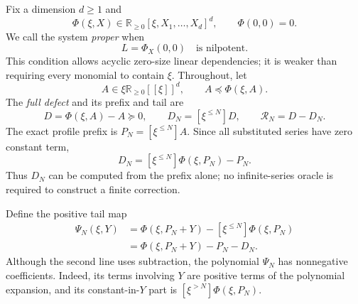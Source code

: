\documentclass[11pt,a4paper]{article}
\theoremstyle{definition}
\theoremstyle{remark}
\newcommand{\R}{\mathbb R}
\newcommand{\strunc}[1]{[\xi^{\le #1}]}
\newcommand{\shigh}[1]{[\xi^{>#1}]}
\newcommand{\satR}{\mathcal R}
\begin{document}
Fix a dimension $d\ge1$ and
\[
 \Phi(\xi,X)\in\R_{\ge0}[\xi,X_1,\ldots,X_d]^d,
 \qquad \Phi(0,0)=0.
\]
We call the system \emph{proper} when
\begin{equation}\label{kfp:sat:eq:proper}
 L=\Phi_X(0,0)\quad\text{is nilpotent}.
\end{equation}
This condition allows acyclic zero-size linear dependencies; it is weaker
than requiring every monomial to contain $\xi$. Throughout, let
\begin{equation}\label{kfp:sat:eq:subsolution}
 A\in \xi\R_{\ge0}[[\xi]]^d,
 \qquad A\preceq\Phi(\xi,A).
\end{equation}
The \emph{full defect} and its prefix and tail are
\begin{equation}\label{kfp:sat:eq:defects}
 D=\Phi(\xi,A)-A\succeq0,\qquad
 D_N=\strunc N D,\qquad
 \satR_N=D-D_N.
\end{equation}
The exact profile prefix is $P_N=\strunc N A$.
Since all substituted series have zero constant term,
\begin{equation}\label{kfp:sat:eq:finite-computation}
 D_N=\strunc N\Phi(\xi,P_N)-P_N.
\end{equation}
Thus $D_N$ can be computed from the prefix alone; no infinite-series
oracle is required to construct a finite correction.

Define the positive tail map
\begin{align}
 \Psi_N(\xi,Y)
 &=\Phi(\xi,P_N+Y)-\strunc N\Phi(\xi,P_N)\label{kfp:sat:eq:psi}\\
 &=\Phi(\xi,P_N+Y)-P_N-D_N.\nonumber
\end{align}
Although the second line uses subtraction, the polynomial $\Psi_N$ has
nonnegative coefficients. Indeed, its terms involving $Y$ are positive
terms of the polynomial expansion, and its constant-in-$Y$ part is
$\shigh N\Phi(\xi,P_N)$.
\end{document}
